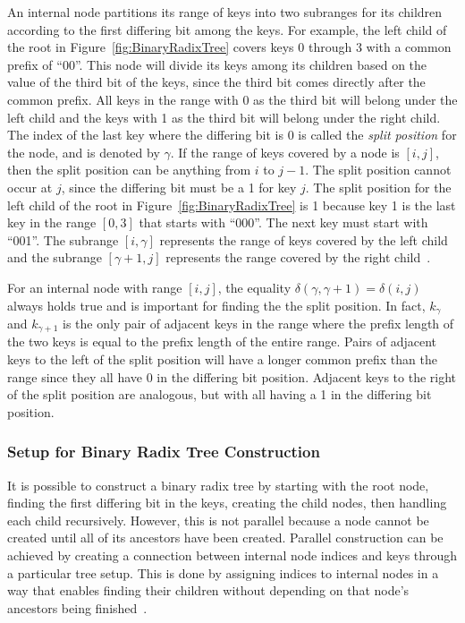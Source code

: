 \documentclass{sig-alternate}
\begin{document}
An internal node partitions its range of keys into two subranges for its children according to the first differing bit among the keys. For example, the left child of the root in Figure~\ref{fig:BinaryRadixTree} covers keys 0 through 3 with a common prefix of ``00''. This node will divide its keys among its children based on the value of the third bit of the keys, since the third bit comes directly after the common prefix. All keys in the range with 0 as the third bit will belong under the left child and the keys with 1 as the third bit will belong under the right child. The index of the last key where the differing bit is 0 is called the \emph{split position} for the node, and is denoted by $\gamma$. If the range of keys covered by a node is $[i,j]$, then the split position can be anything from $i$ to $j-1$. The split position cannot occur at $j$, since the differing bit must be a 1 for key $j$. The split position for the left child of the root in Figure~\ref{fig:BinaryRadixTree} is 1 because key 1 is the last key in the range $[0,3]$ that starts with ``000''. The next key must start with ``001''. The subrange $[i,\gamma]$ represents the range of keys covered by the left child and the subrange $[\gamma+1,j]$ represents the range covered by the right child~\cite{Karras:2012}.

For an internal node with range $[i,j]$, the equality $\delta(\gamma,\gamma+1)=\delta(i,j)$ always holds true and is important for finding the the split position. In fact, $k_{\gamma}$ and $k_{\gamma+1}$ is the only pair of adjacent keys in the range where the prefix length of the two keys is equal to the prefix length of the entire range. Pairs of adjacent keys to the left of the split position will have a longer common prefix than the range since they all have 0 in the differing bit position. Adjacent keys to the right of the split position are analogous, but with all having a 1 in the differing bit position.

\subsubsection{Setup for Binary Radix Tree Construction}
\label{sec:setup}

It is possible to construct a binary radix tree by starting with the root node, finding the first differing bit in the keys, creating the child nodes, then handling each child recursively. However, this is not parallel because a node cannot be created until all of its ancestors have been created. Parallel construction can be achieved by creating a connection between internal node indices and keys through a particular tree setup. This is done by assigning indices to internal nodes in a way that enables finding their children without depending on that node's ancestors being finished~\cite{Karras:2012}.
\end{document}
